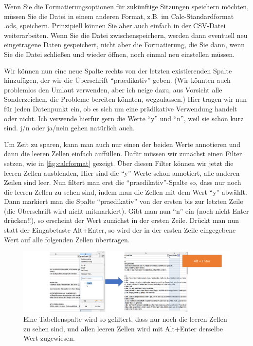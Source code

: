 \documentclass[]{article}
\begin{document}
Wenn Sie die Formatierungsoptionen für zukünftige Sitzungen speichern
möchten, müssen Sie die Datei in einem anderen Format, z.B. im
Calc-Standardformat .ods, speichern. Prinzipiell können Sie aber auch
einfach in der CSV-Datei weiterarbeiten. Wenn Sie die Datei
zwischenspeichern, werden dann eventuell neu eingetragene Daten
gespeichert, nicht aber die Formatierung, die Sie dann, wenn Sie die
Datei schließen und wieder öffnen, noch einmal neu einstellen müssen.

Wir können nun eine neue Spalte rechts von der letzten existierenden
Spalte hinzufügen, der wir die Überschrift \enquote{praedikativ} geben.
(Wir könnten auch problemlos den Umlaut verwenden, aber ich neige dazu,
aus Vorsicht alle Sonderzeichen, die Probleme bereiten könnten,
wegzulassen.) Hier tragen wir nun für jeden Datenpunkt ein, ob es sich
um eine prädikative Verwendung handelt oder nicht. Ich verwende hierfür
gern die Werte \enquote{y} und \enquote{n}, weil sie schön kurz sind.
j/n oder ja/nein gehen natürlich auch.

Um Zeit zu sparen, kann man auch nur einen der beiden Werte annotieren
und dann die leeren Zellen einfach auffüllen. Dafür müssen wir zunächst
einen Filter setzen, wie in \ref{fig:calcformat} gezeigt. Über diesen
Filter können wir jetzt die leeren Zellen ausblenden, Hier sind die
\enquote{y}-Werte schon annotiert, alle anderen Zeilen sind leer. Nun
filtert man erst die \enquote{praedikativ}-Spalte so, dass nur noch die
leeren Zellen zu sehen sind, indem man die Zellen mit dem Wert
\enquote{y} abwählt. Dann markiert man die Spalte \enquote{praedikativ}
von der ersten bis zur letzten Zeile (die Überschrift wird nicht
mitmarkiert). Gibt man nun \enquote{n} ein (noch nicht Enter drücken!!),
so erscheint der Wert zunächst in der ersten Zeile. Drückt man nun statt
der Eingabetaste Alt+Enter, so wird der in der ersten Zeile eingegebene
Wert auf alle folgenden Zellen übertragen.

\begin{figure}
\includegraphics[width=6.66in]{docs/fig/calc_bulkchange} \caption{Eine Tabellenspalte wird so gefiltert, dass nur noch die leeren Zellen zu sehen sind, und allen leeren Zellen wird mit Alt+Enter derselbe Wert zugewiesen.}\label{fig:calcbulkchange}
\end{figure}
\end{document}
